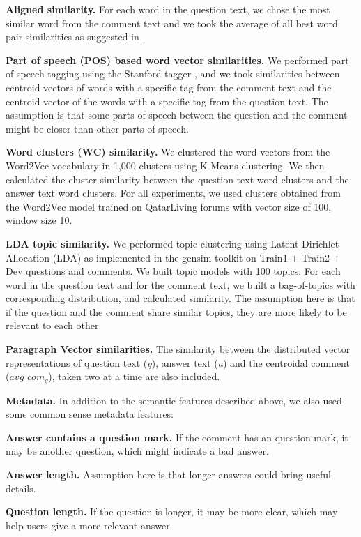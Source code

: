 \documentclass[12pt, a4paper, oneside]{Thesis} %
\begin{document}
\textbf{Aligned similarity.} For each word in the question text, we chose the most similar word from the comment text and we took the average of all best word pair similarities as suggested in \cite{tran2015jaist}.

\textbf{Part of speech (POS) based word vector similarities.} We performed part of speech tagging using the Stanford tagger \cite{toutanova2003feature}, and we took similarities between centroid vectors of words with a specific tag from the comment text and the centroid vector of the words with a specific tag from the question text. The assumption is that some parts of speech between the question and the comment might be closer than other parts of speech.

\textbf{Word clusters (WC) similarity.} We clustered the word vectors from the Word2Vec vocabulary in 1,000 clusters using K-Means clustering. We then calculated the cluster similarity between the question text word clusters and the answer text word clusters. For all experiments, we used clusters obtained from the Word2Vec model trained on QatarLiving forums with vector size of 100, window size 10.

\textbf{LDA topic similarity.} We performed topic clustering using Latent Dirichlet Allocation (LDA) as implemented in the gensim toolkit \cite{rehurek2010software} on Train1 + Train2 + Dev questions and comments. We built topic models with 100 topics. For each word in the question text and for the comment text, we built a bag-of-topics with corresponding distribution, and calculated similarity. The assumption here is that if the question and the comment share similar topics, they are more likely to be relevant to each other.

\textbf{Paragraph Vector similarities.} The similarity between the distributed vector representations of question text (\textit{q}), answer text (\textit{a}) and the centroidal comment ($avg\_com_q$), taken two at a time are also included.

\textbf{Metadata.} In addition to the semantic features described above, we also used some common sense metadata features:

\textbf{Answer contains a question mark.} If the comment has an question mark, it may be another question, which might indicate a bad answer.

\textbf{Answer length.} Assumption here is that longer answers could bring useful details.

\textbf{Question length.} If the question is longer, it may be more clear, which may help users give a more relevant answer.
\end{document}
